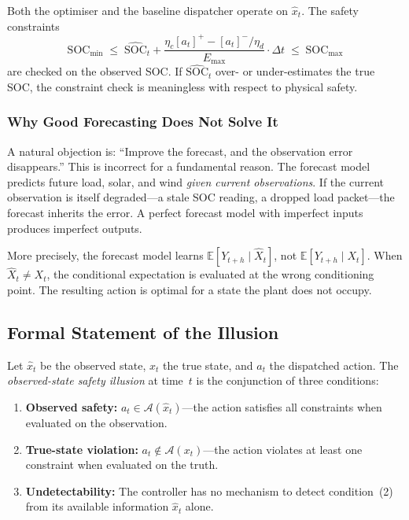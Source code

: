 Both the optimiser and the baseline dispatcher operate on
$\hat{x}_t$.  The safety constraints
\[
  \mathrm{SOC}_{\min} \;\le\;
  \widehat{\mathrm{SOC}}_t + \frac{\eta_c [a_t]^{+} - [a_t]^{-}/\eta_d}{E_{\max}} \cdot \Delta t
  \;\le\; \mathrm{SOC}_{\max}
\]
are checked on the observed SOC.  If $\widehat{\mathrm{SOC}}_t$ over- or
under-estimates the true SOC, the constraint check is meaningless with
respect to physical safety.

\subsubsection{Why Good Forecasting Does Not Solve It}

A natural objection is: ``Improve the forecast, and the observation error
disappears.''  This is incorrect for a fundamental reason.  The forecast
model predicts future load, solar, and wind \emph{given current
observations}.  If the current observation is itself degraded---a stale
SOC reading, a dropped load packet---the forecast inherits the error.  A
perfect forecast model with imperfect inputs produces imperfect outputs.

More precisely, the forecast model learns $\mathbb{E}[Y_{t+h} \mid
\hat{X}_t]$, not $\mathbb{E}[Y_{t+h} \mid X_t]$.  When
$\hat{X}_t \ne X_t$, the conditional expectation is evaluated at the wrong
conditioning point.  The resulting action is optimal for a state the plant
does not occupy.

\subsection{Formal Statement of the Illusion}
\label{sec:formal-illusion}

\begin{definition}
\label{def:safety-illusion}
Let $\hat{x}_t$ be the observed state, $x_t$ the true state, and
$a_t$ the dispatched action.  The \emph{observed-state safety illusion}
at time~$t$ is the conjunction of three conditions:
\begin{enumerate}
  \item \textbf{Observed safety:}
    $a_t \in \mathcal{A}(\hat{x}_t)$---the action satisfies all
    constraints when evaluated on the observation.
  \item \textbf{True-state violation:}
    $a_t \notin \mathcal{A}(x_t)$---the action violates at least one
    constraint when evaluated on the truth.
  \item \textbf{Undetectability:}
    The controller has no mechanism to detect condition~(2) from its
    available information $\hat{x}_t$ alone.
\end{enumerate}
\end{definition}

